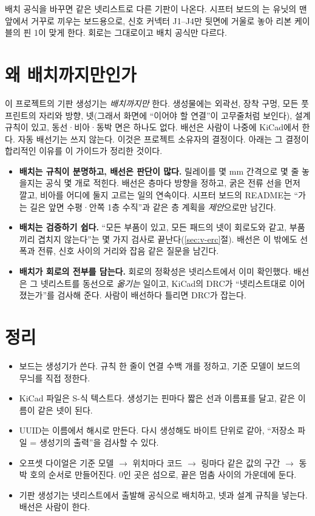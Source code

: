 배치 공식을 바꾸면 같은 넷리스트로 다른 기판이 나온다. 시프터 보드의 는 유닛의 맨 앞에서 거꾸로
끼우는 보드용으로, 신호 커넥터 J1--J4만 뒷면에 거울로 놓아 리본 케이블의 핀 1이 맞게 한다. 회로는 그대로이고 배치 공식만
다르다.

\section{왜 배치까지만인가}\label{sec:gen-noroute}

이 프로젝트의 기판 생성기는 \emph{배치까지만} 한다. 생성물에는 외곽선, 장착 구멍, 모든 풋프린트의 자리와 방향,
넷(그래서 화면에 ``이어야 할 연결''이 고무줄처럼 보인다), 설계 규칙이 있고, 동선·비아·동박 면은 하나도 없다.
배선은 사람이 나중에 KiCad에서 한다. 자동 배선기는 쓰지 않는다. 이것은 프로젝트 소유자의 결정이다. 아래는 그
결정이 합리적인 이유를 이 가이드가 정리한 것이다.

\begin{itemize}
\item \textbf{배치는 규칙이 분명하고, 배선은 판단이 많다.} 릴레이를 몇 mm 간격으로 몇 줄 놓을지는 공식 몇 개로
적힌다. 배선은 층마다 방향을 정하고, 굵은 전류 선을 먼저 깔고, 비아를 어디에 둘지 고르는 일의 연속이다. 시프터
보드의 README는 ``가는 길은 앞면 수평·안쪽 1층 수직''과 같은 층 계획을 \emph{제안}으로만 남긴다.
\item \textbf{배치는 검증하기 쉽다.} ``모든 부품이 있고, 모든 패드의 넷이 회로도와 같고, 부품끼리 겹치지 않는다''는
몇 가지 검사로 끝난다(\ref{sec:v-erc}절). 배선은 이 밖에도 선폭과 전류, 신호 사이의 거리와 잡음 같은 질문을 남긴다.
\item \textbf{배치가 회로의 전부를 담는다.} 회로의 정확성은 넷리스트에서 이미 확인했다. 배선은 그 넷리스트를
동선으로 \emph{옮기는} 일이고, KiCad의 DRC가 ``넷리스트대로 이어졌는가''를 검사해 준다. 사람이 배선하다 틀리면
DRC가 잡는다.
\end{itemize}

\section{정리}

\begin{itemize}
\item 보드는 생성기가 쓴다. 규칙 한 줄이 연결 수백 개를 정하고, 기준 모델이 보드의 무늬를 직접 정한다.
\item KiCad 파일은 S-식 텍스트다. 생성기는 핀마다 짧은 선과 이름표를 달고, 같은 이름이 같은 넷이 된다.
\item UUID는 이름에서 해시로 만든다. 다시 생성해도 바이트 단위로 같아, ``저장소 파일 = 생성기의 출력''을
검사할 수 있다.
\item 오프셋 다이얼은 기준 모델 $\to$ 위치마다 코드 $\to$ 링마다 같은 값의 구간 $\to$ 동박 호의 순서로 만들어진다.
0인 곳은 섬으로, 끝은 멈춤 사이의 가운데에 둔다.
\item 기판 생성기는 넷리스트에서 출발해 공식으로 배치하고, 넷과 설계 규칙을 넣는다. 배선은 사람이 한다.
\end{itemize}
